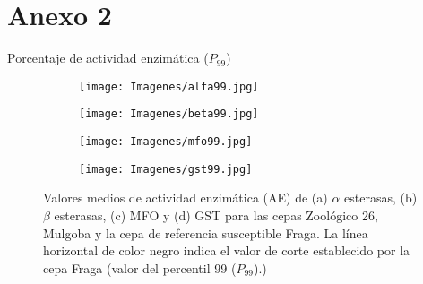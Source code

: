 \setcounter{figure}{0}
\section *{Anexo 2} \label{ane2}
\begin{center}
	{\Large Porcentaje de actividad enzimática ($P_{99}$)}
\end{center}
\medskip
\medskip
\medskip
\medskip
\begin{figure}[h]
\begin{subfigure}{.5\textwidth} 
	\centering
	\texttt{[image: Imagenes/alfa99.jpg]}
	\caption{}
	\label{alfa99}
\end{subfigure}
\begin{subfigure}{.5\textwidth}
	\centering
	\texttt{[image: Imagenes/beta99.jpg]}
	\caption{}
	\label{beta99}
\end{subfigure}
\par\bigskip
\begin{subfigure}{.5\textwidth}
	\centering
	\texttt{[image: Imagenes/mfo99.jpg]}
	\caption{}
	\label{mfo99}
\end{subfigure}
\begin{subfigure}{.5\textwidth}
	\centering
	\texttt{[image: Imagenes/gst99.jpg]}
	\caption{}
	\label{gst99}
\end{subfigure}
\caption{Valores medios de actividad enzimática (AE) de (a) $\alpha$ esterasas, (b) $\beta$ esterasas, (c) MFO  y (d) GST para las cepas Zoológico 26,  Mulgoba y la cepa de referencia susceptible Fraga. La línea horizontal de color negro indica el valor de corte establecido por la cepa Fraga (valor del percentil 99 ($P_{99}$).)}
\label{figura:99}
\end{figure}
\clearpage

\setcounter{figure}{0}
